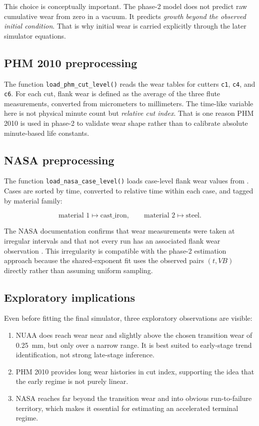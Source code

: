 \documentclass[11pt,a4paper]{article}
\newcommand{\vb}{V\!B}
\newcommand{\code}[1]{\texttt{#1}}
\begin{document}
This choice is conceptually important. The phase-2 model does not predict raw cumulative wear from zero in a
vacuum. It predicts \emph{growth beyond the observed initial condition}. That is why initial wear is carried explicitly
through the later simulator equations.

\subsection{PHM 2010 preprocessing}

The function \code{load\_phm\_cut\_level()} reads the wear tables for cutters \code{c1}, \code{c4}, and \code{c6}.
For each cut, flank wear is defined as the average of the three flute measurements, converted from micrometers to
millimeters. The time-like variable here is not physical minute count but \emph{relative cut index}. That is one reason
PHM 2010 is used in phase-2 to validate wear shape rather than to calibrate absolute minute-based life constants.

\subsection{NASA preprocessing}

The function \code{load\_nasa\_case\_level()} loads case-level flank wear values from
. Cases are sorted by time, converted to relative time within each case,
and tagged by material family:

\[
\text{material } 1 \mapsto \text{cast\_iron}, \qquad
\text{material } 2 \mapsto \text{steel}.
\]

The NASA documentation confirms that wear measurements were taken at irregular intervals and that not every run
has an associated flank wear observation \cite{nasa_doc}. This irregularity is compatible with the phase-2 estimation
approach because the shared-exponent fit uses the observed pairs \((t, \vb)\) directly rather than assuming uniform
sampling.

\subsection{Exploratory implications}

Even before fitting the final simulator, three exploratory observations are visible:

\begin{enumerate}[leftmargin=1.8em]
\item NUAA does reach wear near and slightly above the chosen transition wear of \SI{0.25}{mm}, but only over a narrow
range. It is best suited to early-stage trend identification, not strong late-stage inference.
\item PHM 2010 provides long wear histories in cut index, supporting the idea that the early regime is not purely linear.
\item NASA reaches far beyond the transition wear and into obvious run-to-failure territory, which makes it essential for
estimating an accelerated terminal regime.
\end{enumerate}
\end{document}
